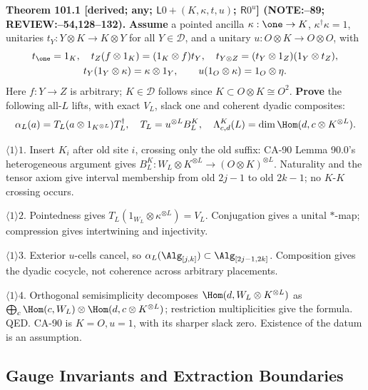 \textbf{Theorem 101.1 [derived; any; \(\mathsf L0+(K,\kappa,t,u)\); \(\mathsf R0^u\)] (NOTE:--89; REVIEW:--54,128--132).}
\textbf{Assume} a pointed ancilla \(\kappa:\one\to K\), \(\kappa^\dagger\kappa=1\), unitaries
\(t_Y:Y\otimes K\to K\otimes Y\) for all \(Y\in\mathcal D\), and a unitary \(u:O\otimes K\to O\otimes O\), with
\[\begin{gathered}
 t_\one=1_K,\quad t_Z(f\otimes1_K)=(1_K\otimes f)t_Y,\quad t_{Y\otimes Z}=(t_Y\otimes1_Z)(1_Y\otimes t_Z),\\
 t_Y(1_Y\otimes\kappa)=\kappa\otimes1_Y,\qquad u(1_O\otimes\kappa)=1_O\otimes\eta .
\end{gathered}\]
Here \(f:Y\to Z\) is arbitrary; \(K\in\mathcal D\) follows since \(K\subset O\otimes K\cong O^2\).
\textbf{Prove} the following all-\(L\) lifts, with exact \(V_L\), slack one and coherent dyadic composites:
\begin{equation}\label{eq:101-ancilla}
 \alpha_L(a)=T_L(a\otimes1_{K^{\otimes L}})T_L^\dagger,\quad
 T_L=u^{\otimes L}B_L^K,\quad
 \Lambda^K_{c,d}(L)=\dim\Hom(d,c\otimes K^{\otimes L}).
\end{equation}
\par\(\langle1\rangle1\). Insert \(K_i\) after old site \(i\), crossing only the old suffix: CA-90 Lemma 90.0's
heterogeneous argument gives \(B_L^K:W_L\otimes K^{\otimes L}\to(O\otimes K)^{\otimes L}\).
Naturality and the tensor axiom give interval membership from old \(2j-1\) to old \(2k-1\); no \(K\)-\(K\) crossing occurs.
\par\(\langle1\rangle2\). Pointedness gives \(T_L(1_{W_L}\otimes\kappa^{\otimes L})=V_L\).
Conjugation gives a unital \(*\)-map; compression gives intertwining and injectivity.
\par\(\langle1\rangle3\). Exterior \(u\)-cells cancel, so \(\alpha_L(\Alg_{[j,k]})\subset\Alg_{[2j-1,2k]}\).
Composition gives the dyadic cocycle, not coherence across arbitrary placements.
\par\(\langle1\rangle4\). Orthogonal semisimplicity decomposes \(\Hom(d,W_L\otimes K^{\otimes L})\) as
\(\bigoplus_c\Hom(c,W_L)\otimes\Hom(d,c\otimes K^{\otimes L})\); restriction multiplicities give the formula. QED.
CA-90 is \(K=O,u=1\), with its sharper slack zero. Existence of the datum is an assumption.

\subsection{Gauge Invariants and Extraction Boundaries}


